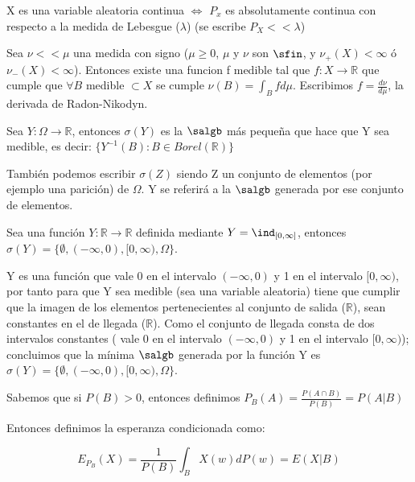 \documentclass{apuntes}
\begin{document}
\begin{defn}
X es una variable aleatoria continua $\Leftrightarrow$ $P_x$ es absolutamente continua con respecto a la medida de Lebesgue ($\lambda$) (se escribe $P_X << \lambda$)
\end{defn}

\begin{theorem}
Sea $\nu << \mu$ una medida con signo ($\mu \geq 0$, $\mu$ y $\nu$ son $\sfin$, y $\nu_+(X) < \infty$ ó $\nu_-(X) < \infty$). Entonces existe una funcion f medible tal que $f:X \rightarrow \mathbb{R}$ que cumple que $\forall B$ medible $\subset X$ se cumple $\nu(B)=\int_Bfd\mu$. Escribimos $f=\frac{d\nu}{d\mu}$, la derivada de Radon-Nikodyn. 
\end{theorem}


\begin{defn}
Sea $Y: \Omega \rightarrow \mathbb{R}$, entonces $\sigma(Y)$ es la $\salgb$ más pequeña que hace que Y sea medible, es decir: $\{Y^{-1}(B):B \in Borel(\mathbb{R})\}$
\end{defn}

\obs También podemos escribir $\sigma(Z)$ siendo Z un conjunto de elementos (por ejemplo una parición) de $\Omega$. Y se referirá a la $\salgb$ generada por ese conjunto de elementos.

\begin{example}
Sea una función $Y:\mathbb{R} \rightarrow \mathbb{R}$ definida mediante $Y=\ind_{[0,\infty]}$, entonces $\sigma(Y)=\{\emptyset, (-\infty, 0), [0, \infty), \Omega \}$.

\begin{expla}
Y es una función que vale 0 en el intervalo $(-\infty, 0)$ y 1 en el intervalo $[0, \infty)$, por tanto para que Y sea medible (sea una variable aleatoria) tiene que cumplir que la imagen de los elementos pertenecientes al conjunto de salida ($\mathbb{R}$), sean constantes en el de llegada ($\mathbb{R}$). Como el conjunto de llegada consta de dos intervalos constantes ( vale 0 en el intervalo $(-\infty, 0)$ y 1 en el intervalo $[0, \infty)$); concluimos que la mínima $\salgb$ generada por la función Y es $\sigma(Y)=\{\emptyset, (-\infty, 0), [0, \infty), \Omega \}$.
\end{expla}
 
\end{example}

\begin{defn}

Sabemos que si $P(B)>0$, entonces definimos $P_B(A)=\frac{P(A \cap B)}{P(B)}=P(A|B)$

Entonces definimos la esperanza condicionada como:

\[
E_{P_B}(X)=\frac{1}{P(B)}\int_{B}X(w)dP(w)=E(X|B)
\]
\end{defn}
\end{document}
